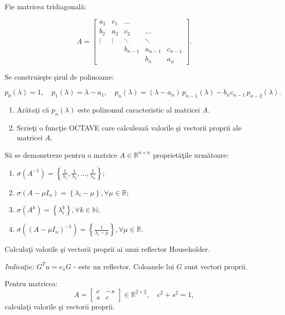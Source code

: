 \documentclass{exam}
\begin{document}
\begin{questions}
        \boxedpoints
	\pointsinmargin
    \question Fie matricea tridiagonală:

\[
	A = \begin{bmatrix}
			a_1 & c_1 & \dots &        &        \\
			b_2 & a_2 & c_2   & \dots  &        \\
			\vdots & \vdots & \ddots & \ddots &        \\
			      &        & b_{n-1} & a_{n-1} & c_{n-1} \\
			      &        &        & b_n     & a_n
	\end{bmatrix}.
\]

Se construieşte şirul de polinoame:

\[
	p_0(\lambda) = 1,\quad
	p_1(\lambda) = \lambda - a_1,\quad
	p_n(\lambda) = (\lambda - a_n)\,p_{n-1}(\lambda) - b_n c_{n-1}\,p_{n-2}(\lambda).
\]

\begin{enumerate}
	\item Arătaţi că $p_{n}(\lambda)$ este polinomul caracteristic al matricei $A$.
	\item Scrieţi o funcţie OCTAVE care calculează valorile şi vectorii proprii ale matricei $A$.
\end{enumerate}

\question

Să se demonstreze pentru o matrice $A \in \mathbb{R}^{n \times n}$ proprietăţile următoare:

\begin{enumerate}
	\item $\sigma(A^{-1}) = \left\lbrace \tfrac{1}{\lambda _{1}}, \tfrac{1}{\lambda _{2}}, \ldots, \tfrac{1}{\lambda _{n}}\right\rbrace $;
	\item $\sigma(A - \mu I_{n}) = \left\lbrace \lambda_{i} - \mu \right\rbrace , \forall \mu \in \mathbb{R}$;
	\item $\sigma(A^{k}) = \left\lbrace \lambda_{i}^{k} \right\rbrace , \forall k \in \mathbb{N}$;
	\item $\sigma((A - \mu I_{n})^{- 1}) = \left\lbrace \tfrac{1}{\lambda_{i} - \mu} \right\rbrace , \forall \mu \in \mathbb{R}$.
\end{enumerate}

\question
Calculaţi valorile şi vectorii proprii ai unui reflector Householder.

\emph{Indicaţie:} $G^T u = e_1G$  - este un reflector. Coloanele lui $G$ sunt vectori proprii.

\question
Pentru matricea:
\[
	A = \begin{bmatrix}
			c & -s \\
			s & c
		\end{bmatrix}
	\in \mathbb{R}^{2 \times 2}, \quad c^2 + s^2 = 1,
\]
calculaţi valorile şi vectorii proprii.
\end{questions}
\end{document}
